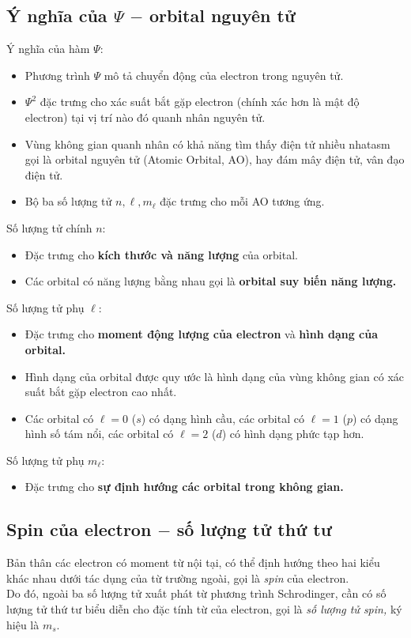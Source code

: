 \subsection{Ý nghĩa của $\Psi$ $-$ orbital nguyên tử}
Ý nghĩa của hàm $\Psi:$
\begin{itemize}
\item Phương trình $\Psi$ mô tả chuyển động của electron trong nguyên tử.
\item $\Psi ^2$ đặc trưng cho xác suất bắt gặp electron (chính xác hơn là mật độ electron) tại vị trí nào đó quanh nhân nguyên tử.
\item Vùng không gian quanh nhân có khả năng tìm thấy điện tử nhiều nhatasm gọi là orbital nguyên tử (Atomic Orbital, AO), hay đám mây điện tử, vân đạo điện tử.
\item Bộ ba số lượng tử $n, \ell, m_{\ell}$ đặc trưng cho mỗi AO tương ứng. 
\end{itemize}
Số lượng tử chính $n:$
\begin{itemize}
\item Đặc trưng cho \textbf{kích thước và năng lượng} của orbital.
\item Các orbital có năng lượng bằng nhau gọi là \textbf{orbital suy biến năng lượng.}
\end{itemize}
Số lượng tử phụ $\ell:$
\begin{itemize}
\item Đặc trưng cho \textbf{moment động lượng của electron} và \textbf{hình dạng của orbital.}
\item Hình dạng của orbital được quy ước là hình dạng của vùng không gian có xác suất bắt gặp electron cao nhất.
\item Các orbital có $\ell = 0$ ($s$) có dạng hình cầu, các orbital có $\ell = 1$ ($p$) có dạng hình số tám nổi, các orbital có $\ell = 2$ ($d$) có hình dạng phức tạp hơn.
\end{itemize}
Số lượng tử phụ $m_{\ell}:$
\begin{itemize}
\item Đặc trưng cho \textbf{sự định hướng các orbital trong không gian.}
\end{itemize}
\subsection{Spin của electron $-$ số lượng tử thứ tư}
Bản thân các electron có moment từ nội tại, có thể định hướng theo hai kiểu khác nhau dưới tác dụng của từ trường ngoài, gọi là \textit{spin} của electron. \\
Do đó, ngoài ba số lượng tử xuất phát từ phương trình Schrodinger, cần có số lượng tử thứ tư biểu diễn cho đặc tính từ của electron, gọi là \textit{số lượng tử spin,} ký hiệu là $m_s.$
